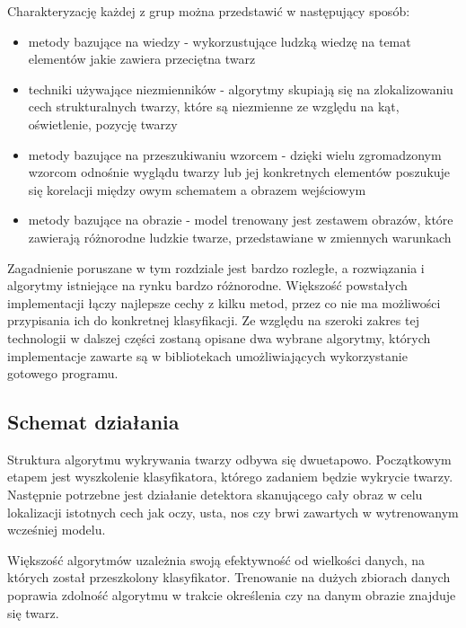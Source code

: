 Charakteryzację każdej z grup \cite{Yang} można przedstawić w następujący sposób:
\begin{itemize}
    \item metody bazujące na wiedzy - wykorzustujące ludzką wiedzę na temat elementów jakie zawiera przeciętna twarz
    \item techniki używające niezmienników - algorytmy skupiają się na zlokalizowaniu cech strukturalnych twarzy, które są niezmienne ze względu na kąt, oświetlenie, pozycję twarzy
    \item metody bazujące na przeszukiwaniu wzorcem - dzięki wielu zgromadzonym wzorcom odnośnie wyglądu twarzy lub jej konkretnych elementów poszukuje się korelacji między owym schematem a obrazem wejściowym
    \item metody bazujące na obrazie - model trenowany jest zestawem obrazów, które zawierają różnorodne ludzkie twarze, przedstawiane w zmiennych warunkach
\end{itemize}
Zagadnienie poruszane w tym rozdziale jest bardzo rozległe, a rozwiązania i algorytmy istniejące na rynku bardzo różnorodne. Większość powstałych implementacji łączy najlepsze cechy z kilku metod, przez co nie ma możliwości przypisania ich do konkretnej klasyfikacji. Ze względu na szeroki zakres tej technologii w dalszej części zostaną opisane dwa wybrane algorytmy, których implementacje zawarte są w bibliotekach umożliwiających wykorzystanie gotowego programu.

\subsection{Schemat działania}

Struktura algorytmu wykrywania twarzy odbywa się dwuetapowo. Początkowym etapem jest wyszkolenie klasyfikatora, którego zadaniem będzie wykrycie twarzy. Następnie potrzebne jest działanie detektora skanującego cały obraz w celu lokalizacji istotnych cech jak oczy, usta, nos czy brwi zawartych w wytrenowanym wcześniej modelu.

Większość algorytmów uzależnia swoją efektywność od wielkości danych, na których został przeszkolony klasyfikator. Trenowanie na dużych zbiorach danych poprawia zdolność algorytmu w trakcie określenia czy na danym obrazie znajduje się twarz. \cite{fDetection}

